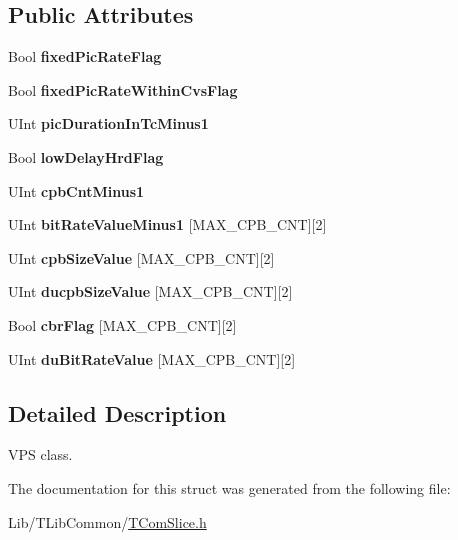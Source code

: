 \subsection*{Public Attributes}
\begin{DoxyCompactItemize}
\item 
\mbox{\label{struct_hrd_sub_layer_info_a9d8ff0ed124ccb3a5e2c333da75e0b20}} 
Bool {\bfseries fixed\+Pic\+Rate\+Flag}
\item 
\mbox{\label{struct_hrd_sub_layer_info_a78225a271fbfaf8cd63387f3769d8be1}} 
Bool {\bfseries fixed\+Pic\+Rate\+Within\+Cvs\+Flag}
\item 
\mbox{\label{struct_hrd_sub_layer_info_a48d0929fa015e06402cb672532418fc5}} 
U\+Int {\bfseries pic\+Duration\+In\+Tc\+Minus1}
\item 
\mbox{\label{struct_hrd_sub_layer_info_acad89ed58b01378380f49af48889f442}} 
Bool {\bfseries low\+Delay\+Hrd\+Flag}
\item 
\mbox{\label{struct_hrd_sub_layer_info_ac028468ca600b2581a4c0072e665a4ef}} 
U\+Int {\bfseries cpb\+Cnt\+Minus1}
\item 
\mbox{\label{struct_hrd_sub_layer_info_a4df37e1d75de994d4cbcd78112dd831f}} 
U\+Int {\bfseries bit\+Rate\+Value\+Minus1} \mbox{[}M\+A\+X\+\_\+\+C\+P\+B\+\_\+\+C\+NT\mbox{]}\mbox{[}2\mbox{]}
\item 
\mbox{\label{struct_hrd_sub_layer_info_af48dc1254605d1d3cf1689eaede9525c}} 
U\+Int {\bfseries cpb\+Size\+Value} \mbox{[}M\+A\+X\+\_\+\+C\+P\+B\+\_\+\+C\+NT\mbox{]}\mbox{[}2\mbox{]}
\item 
\mbox{\label{struct_hrd_sub_layer_info_a275b31e8807c75d9fcdd8d7b3f0b91e6}} 
U\+Int {\bfseries ducpb\+Size\+Value} \mbox{[}M\+A\+X\+\_\+\+C\+P\+B\+\_\+\+C\+NT\mbox{]}\mbox{[}2\mbox{]}
\item 
\mbox{\label{struct_hrd_sub_layer_info_a6466e554236cf37947955455d673a2d2}} 
Bool {\bfseries cbr\+Flag} \mbox{[}M\+A\+X\+\_\+\+C\+P\+B\+\_\+\+C\+NT\mbox{]}\mbox{[}2\mbox{]}
\item 
\mbox{\label{struct_hrd_sub_layer_info_a586bdf4c34989403f83adf4a024006ed}} 
U\+Int {\bfseries du\+Bit\+Rate\+Value} \mbox{[}M\+A\+X\+\_\+\+C\+P\+B\+\_\+\+C\+NT\mbox{]}\mbox{[}2\mbox{]}
\end{DoxyCompactItemize}


\subsection{Detailed Description}
V\+PS class. 

The documentation for this struct was generated from the following file\+:\begin{DoxyCompactItemize}
\item 
Lib/\+T\+Lib\+Common/\hyperlink{_t_com_slice_8h}{T\+Com\+Slice.\+h}\end{DoxyCompactItemize}
